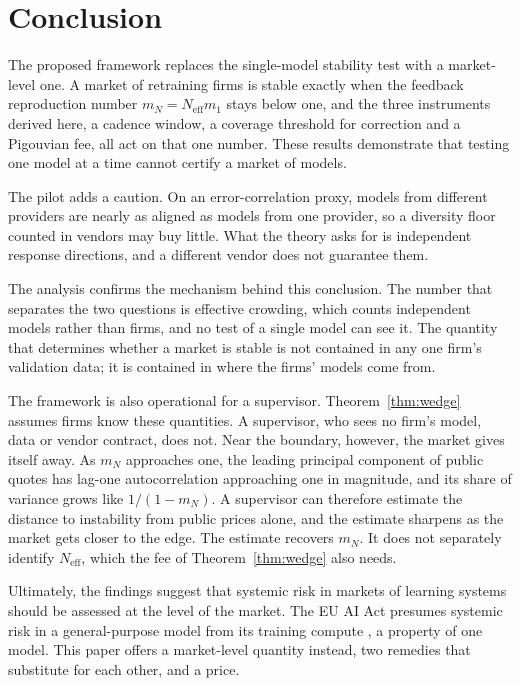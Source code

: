 \documentclass[conference]{IEEEtran}
\theoremstyle{definition}
\newcommand{\Neff}{N_{\mathrm{eff}}}
\begin{document}
\section{Conclusion}
The proposed framework replaces the single-model stability test with a
market-level one. A market of retraining firms is stable exactly when the
feedback reproduction number $m_N = \Neff m_1$ stays below one, and the three
instruments derived here, a cadence window, a coverage threshold for
correction and a Pigouvian fee, all act on that one number. These results
demonstrate that testing one model at a time cannot certify a market of
models.

The pilot adds a caution. On an error-correlation proxy, models from different
providers are nearly as aligned as models from one provider, so a diversity
floor counted in vendors may buy little. What the theory asks for is
independent response directions, and a different vendor does not guarantee
them.

The analysis confirms the mechanism behind this conclusion. The number that
separates the two questions is effective crowding, which counts independent
models rather than firms, and no test of a single model can see it. The
quantity that determines whether a market is stable is not contained in any
one firm's validation data; it is contained in where the firms' models come
from.

The framework is also operational for a supervisor. Theorem~\ref{thm:wedge}
assumes firms know these quantities. A supervisor, who sees no firm's model,
data or vendor contract, does not. Near the boundary, however, the market
gives itself away. As $m_N$ approaches one, the leading principal component of
public quotes has lag-one autocorrelation approaching one in magnitude, and
its share of variance grows like $1/(1 - m_N)$. A supervisor can therefore
estimate the distance to instability from public prices alone, and the
estimate sharpens as the market gets closer to the edge. The estimate recovers
$m_N$. It does not separately identify $\Neff$, which the fee of
Theorem~\ref{thm:wedge} also needs.

Ultimately, the findings suggest that systemic risk in markets of learning
systems should be assessed at the level of the market. The EU AI Act presumes
systemic risk in a general-purpose model from its training compute
\cite{euaiact2024}, a property of one model. This paper offers a market-level
quantity instead, two remedies that substitute for each other, and a price.
\end{document}
